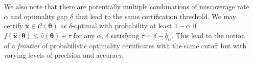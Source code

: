 \documentclass[10pt]{article} %
\theoremstyle{plain}
\theoremstyle{definition}
\theoremstyle{remark}
\begin{document}
We also note that there are potentially multiple combinations of miscoverage rate $\alpha$ and optimality gap $\delta$ that lead to the same certification threshold. We may certify $\hat{\mathbf{x}} \in \mathcal{C}(\bm{\theta})$ as $\delta$-optimal with probability at least $1 - \alpha$ if $f(\hat{\mathbf{x}}\, ; \bm{\theta}) \leq \hat{v}(\bm{\theta}) + \tau$ for any $\alpha$, $\delta$ satisfying $\tau = \delta - \hat{q}_\alpha$. This lead to the notion of a \textit{frontier} of probabilistic optimality certificates with the same cutoff but with varying levels of precision and accuracy.

\end{document}
